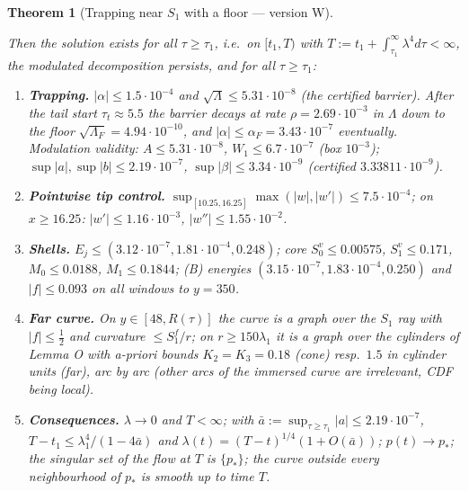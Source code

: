 \documentclass[11pt]{article}
\newtheorem{theorem}{Theorem}
\theoremstyle{definition}
\theoremstyle{remark}
\begin{document}
\begin{theorem}[Trapping near $S_1$ with a floor --- version W]
\begin{enumerate}[label=\textup{(H\arabic*)},leftmargin=*]
\end{enumerate}
Then the solution exists for all $\tau\ge\tau_1$, i.e.\ on $[t_1,T)$ with $T:=t_1+\int_{\tau_1}^\infty\lambda^4d\tau<\infty$, the modulated decomposition persists, and for all $\tau\ge\tau_1$:
\begin{enumerate}[label=\textup{(W\arabic*)},leftmargin=*]
\item \textbf{Trapping.} $|\alpha|\le1.5\cdot10^{-4}$ and $\sqrt\Lambda\le5.31\cdot10^{-8}$ (the certified barrier). After the tail start $\tau_t\approx5.5$ the barrier decays at rate $\rho=2.69\cdot10^{-3}$ in $\Lambda$ down to the floor $\sqrt{\Lambda_F}=4.94\cdot10^{-10}$, and $|\alpha|\le\alpha_F=3.43\cdot10^{-7}$ eventually. Modulation validity: $A\le5.31\cdot10^{-8}$, $W_1\le6.7\cdot10^{-7}$ (box $10^{-3}$); $\sup|a|,\sup|b|\le2.19\cdot10^{-7}$, $\sup|\beta|\le3.34\cdot10^{-9}$ (certified $3.33811\cdot10^{-9}$).
\item \textbf{Pointwise tip control.} $\sup_{[10.25,16.25]}\max(|w|,|w'|)\le7.5\cdot10^{-4}$; on $x\ge16.25$: $|w'|\le1.16\cdot10^{-3}$, $|w''|\le1.55\cdot10^{-2}$.
\item \textbf{Shells.} $E_j\le(3.12\cdot10^{-7},1.81\cdot10^{-4},0.248)$; core $S^v_0\le0.00575$, $S^v_1\le0.171$, $M_0\le0.0188$, $M_1\le0.1844$; (B) energies $(3.15\cdot10^{-7},1.83\cdot10^{-4},0.250)$ and $|f|\le0.093$ on all windows to $y=350$.
\item \textbf{Far curve.} On $y\in[48,R(\tau)]$ the curve is a graph over the $S_1$ ray with $|f|\le\tfrac12$ and curvature $\le S_1^f/r$; on $r\ge150\lambda_1$ it is a graph over the cylinders of Lemma O with a-priori bounds $K_2=K_3=0.18$ (cone) resp.\ $1.5$ in cylinder units (far), arc by arc (other arcs of the immersed curve are irrelevant, CDF being local).
\item \textbf{Consequences.} $\lambda\to0$ and $T<\infty$; with $\bar a:=\sup_{\tau\ge\tau_1}|a|\le2.19\cdot10^{-7}$, $T-t_1\le\lambda_1^4/(1-4\bar a)$ and $\lambda(t)=(T-t)^{1/4}(1+O(\bar a))$; $p(t)\to p_*$; the singular set of the flow at $T$ is $\{p_*\}$; the curve outside every neighbourhood of $p_*$ is smooth up to time $T$.
\end{enumerate}
\end{theorem}
\end{document}
